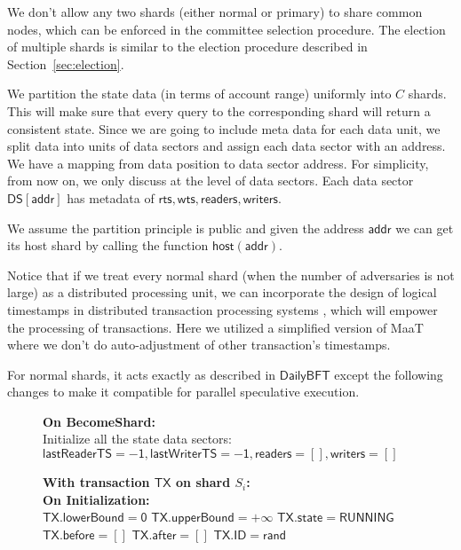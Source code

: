 \documentclass[9pt,oneside]{amsart}
\newcommand\myin{\hspace{0.1in}}
\begin{document}
\begin{multicols}{2}
We don't allow any two shards (either normal or primary) to share common nodes, which can be enforced in the committee selection procedure. The election of
multiple shards is similar to the election procedure described in Section~\ref{sec:election}.

We partition the state data (in terms of account range) uniformly into $C$ shards. This will make sure that every query to the corresponding shard will return
a consistent state. Since we are going to include meta data for each data unit, we split data into units of data sectors and assign each data sector with an
address. We have a mapping from data position to data sector address. For simplicity, from now on, we only discuss at the level of data sectors. Each
data sector $\mathsf{DS[addr]}$ has metadata of $\mathsf{rts, wts, readers, writers}$.

We assume the partition principle is public and given the address $\mathsf{addr}$ we can get its host shard by calling the function $\mathsf{host(addr)}$.

Notice that if we treat every normal shard (when the number of adversaries is not large) as a distributed processing unit, we can incorporate the design of
logical timestamps \cite{yu2016tictoc} in distributed transaction processing systems \cite{mahmoud2014maat}, which will empower the processing of transactions.
Here we utilized a simplified version of MaaT where we don't do auto-adjustment of other transaction's timestamps.

For normal shards, it acts exactly as described in $\mathsf{DailyBFT}$ except the following changes to make it compatible for parallel speculative execution.

\begin{figure*}
\begin{algorithm}[H]
\textbf{On BecomeShard:}\\
\myin Initialize all the state data sectors: $\mathsf{lastReaderTS = -1, lastWriterTS = -1, readers=[], writers=[]}$

\textbf{With transaction $\mathsf{TX}$ on shard $S_i$:\\
On Initialization:}\\
\hspace{0.1in} $\mathsf{TX.lowerBound = 0}$\;
\hspace{0.1in} $\mathsf{TX.upperBound = +\infty}$\;
\hspace{0.1in} $\mathsf{TX.state = RUNNING}$\;
\hspace{0.1in} $\mathsf{TX.before = []}$\;
\hspace{0.1in} $\mathsf{TX.after = []}$\;
\hspace{0.1in} $\mathsf{TX.ID = rand}$\;


\end{algorithm}
\end{figure*}
\end{multicols}
\end{document}
